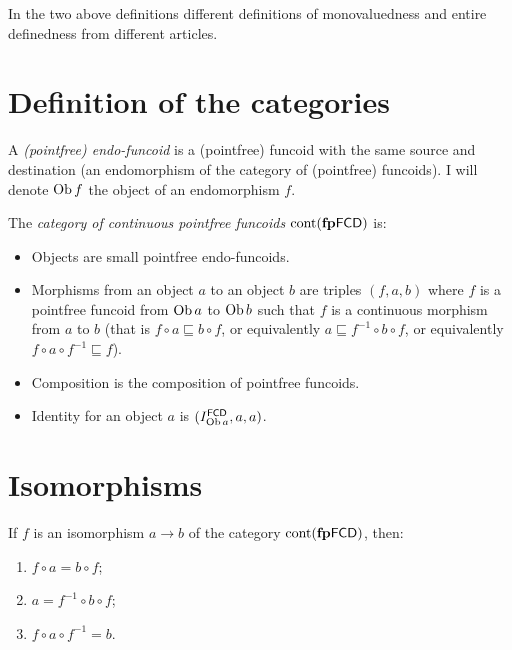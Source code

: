 \begin{rem}
  In the two above definitions different definitions of monovaluedness and
  entire definedness from different articles.
\end{rem}

\section{Definition of the categories}

\begin{defn}
  A \emph{(pointfree) endo-funcoid} is a (pointfree) funcoid with the same
  source and destination (an endomorphism of the category of (pointfree)
  funcoids). I will denote $\operatorname{Ob} f$ the object of an endomorphism $f$.
\end{defn}

\begin{obvious}
The \emph{category of continuous pointfree funcoids} $\operatorname{cont}
(\mathbf{fp} \mathsf{FCD})$ is:
\begin{itemize}
  \item Objects are small pointfree endo-funcoids.
  
  \item Morphisms from an object $a$ to an object $b$ are triples $(f , a ,
  b)$ where $f$ is a pointfree funcoid from $\operatorname{Ob} a$ to $\operatorname{Ob} b$
  such that $f$ is a continuous morphism from $a$ to $b$ (that is $f \circ a
  \sqsubseteq b \circ f$, or equivalently $a \sqsubseteq f^{- 1} \circ b \circ
  f$, or equivalently $f \circ a \circ f^{- 1} \sqsubseteq f$).
  
  \item Composition is the composition of pointfree funcoids.
  
  \item Identity for an object $a$ is $(I^{\mathsf{FCD}}_{\operatorname{Ob} a}
  , a , a)$.
\end{itemize}
\end{obvious}

\section{Isomorphisms}

\begin{thm}
  If $f$ is an isomorphism $a \rightarrow b$ of the category
  $\operatorname{cont} (\mathbf{fp}
  \mathsf{FCD})$, then:
  \begin{enumerate}
    \item $f \circ a = b \circ f$;
    
    \item $a = f^{- 1} \circ b \circ f$;
    
    \item $f \circ a \circ f^{- 1} = b$.
  \end{enumerate}
\end{thm}

